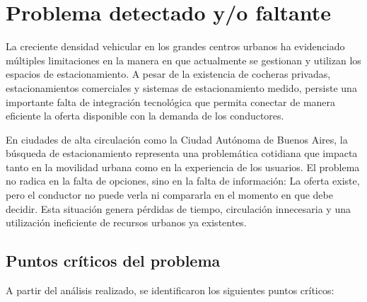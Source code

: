 \section{Problema detectado y/o faltante}\label{sec:problema}

La creciente densidad vehicular en los grandes centros urbanos ha evidenciado múltiples limitaciones en la manera en que actualmente se gestionan y utilizan los espacios de estacionamiento. A pesar de la existencia de cocheras privadas, estacionamientos comerciales y sistemas de estacionamiento medido, persiste una importante falta de integración tecnológica que permita conectar de manera eficiente la oferta disponible con la demanda de los conductores.

En ciudades de alta circulación como la Ciudad Autónoma de Buenos Aires, la búsqueda de estacionamiento representa una problemática cotidiana que impacta tanto en la movilidad urbana como en la experiencia de los usuarios. El problema no radica en la falta de opciones, sino en la falta de información: La oferta existe, pero el conductor no puede verla ni compararla en el momento en que debe decidir. Esta situación genera pérdidas de tiempo, circulación innecesaria y una utilización ineficiente de recursos urbanos ya existentes.

\subsection{Puntos críticos del problema}

A partir del análisis realizado, se identificaron los siguientes puntos críticos:

